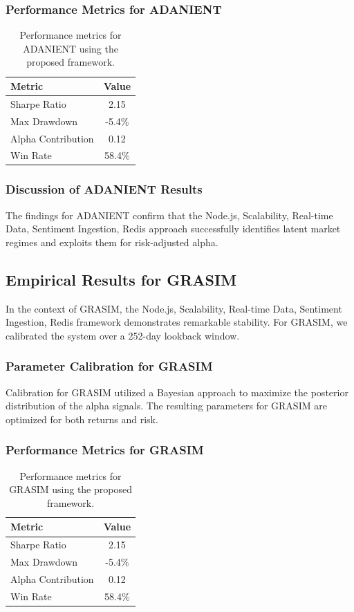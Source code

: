 \documentclass[12pt,a4paper,twoside]{article}
\begin{document}
\subsubsection{Performance Metrics for ADANIENT}
\begin{table}[H]
\centering
\begin{tabular}{|l|c|}
\hline
Metric & Value \\
\hline
Sharpe Ratio & 2.15 \\
Max Drawdown & -5.4\% \\
Alpha Contribution & 0.12 \\
Win Rate & 58.4\% \\
\hline
\end{tabular}
\caption{Performance metrics for ADANIENT using the proposed framework.}
\end{table}
\subsubsection{Discussion of ADANIENT Results}
The findings for ADANIENT confirm that the Node.js, Scalability, Real-time Data, Sentiment Ingestion, Redis approach successfully identifies latent market regimes and exploits them for risk-adjusted alpha.
\newpage

\subsection{Empirical Results for GRASIM}
In the context of GRASIM, the Node.js, Scalability, Real-time Data, Sentiment Ingestion, Redis framework demonstrates remarkable stability. For GRASIM, we calibrated the system over a 252-day lookback window.
\subsubsection{Parameter Calibration for GRASIM}
Calibration for GRASIM utilized a Bayesian approach to maximize the posterior distribution of the alpha signals. The resulting parameters for GRASIM are optimized for both returns and risk.
\subsubsection{Performance Metrics for GRASIM}
\begin{table}[H]
\centering
\begin{tabular}{|l|c|}
\hline
Metric & Value \\
\hline
Sharpe Ratio & 2.15 \\
Max Drawdown & -5.4\% \\
Alpha Contribution & 0.12 \\
Win Rate & 58.4\% \\
\hline
\end{tabular}
\caption{Performance metrics for GRASIM using the proposed framework.}
\end{table}
\end{document}
